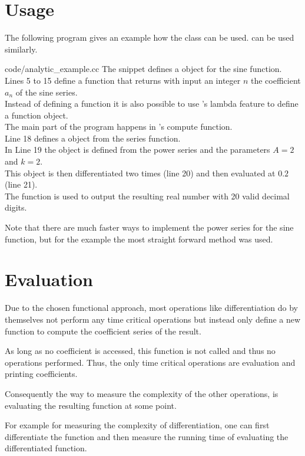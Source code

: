 	\section{Usage}
		The following \cc program gives an example how the \baana class can be used. 
    \anarect can be used similarly.
    
    {code/analytic_example.cc}
   The snippet defines a \baana object for the sine function.\\ 
   Lines 5 to 15 define a function that returns with input an integer $n$ the coefficient $a_n$ of the sine series.\\
   Instead of defining a function it is also possible to use {\ccx}'s lambda feature to define a function object. \\
   The main part of the program happens in {\irram}'s compute function. \\
   Line 18 defines a \powerseries object from the series function. \\
   In Line 19 the \baana object is defined from the power series and the parameters $A=2$ and $k=2$.\\
   This object is then differentiated two times (line 20) and then evaluated at $0.2$ (line 21). \\
   The  function is used to output the resulting real number with 20 valid decimal digits.

   Note that there are much faster ways to implement the power series for the sine function, but for the example
   the most straight forward method was used.

	\section{Evaluation}
		Due to the chosen functional approach, most operations like differentiation do by themselves not perform any time critical operations 
    but instead only define a new function to compute the coefficient series of the result.
    
		As long as no coefficient is accessed, this function is not called and thus no operations performed.
		Thus, the only time critical operations are evaluation and printing coefficients.

		Consequently the way to measure the complexity of the other operations, is evaluating the resulting function at some point.

		For example for measuring the complexity of differentiation, one can  first
    differentiate the function and then measure the running time 
    of evaluating the differentiated function.

